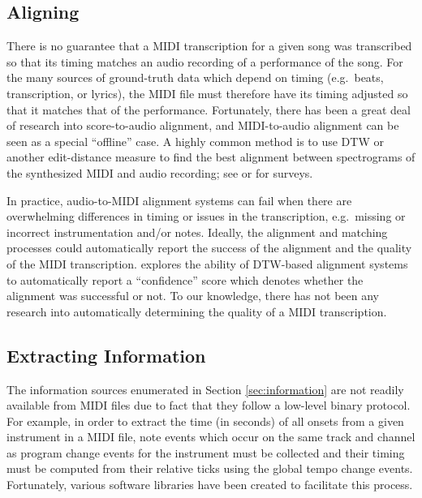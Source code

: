 \documentclass{article}
\begin{document}
\subsection{Aligning}

There is no guarantee that a MIDI transcription for a given song was transcribed so that its timing matches an audio recording of a performance of the song.
For the many sources of ground-truth data which depend on timing (e.g.\ beats, transcription, or lyrics), the MIDI file must therefore have its timing adjusted so that it matches that of the performance.
Fortunately, there has been a great deal of research into score-to-audio alignment, and MIDI-to-audio alignment can be seen as a special ``offline'' case.
A highly common method is to use DTW or another edit-distance measure to find the best alignment between spectrograms of the synthesized MIDI and audio recording; see \cite{raffel2016optimizing} or \cite{ewert2012towards} for surveys.

In practice, audio-to-MIDI alignment systems can fail when there are overwhelming differences in timing or issues in the transcription, e.g.\ missing or incorrect instrumentation and/or notes.
Ideally, the alignment and matching processes could automatically report the success of the alignment and the quality of the MIDI transcription.
\cite{raffel2016optimizing} explores the ability of DTW-based alignment systems to automatically report a ``confidence'' score which denotes whether the alignment was successful or not.
To our knowledge, there has not been any research into automatically determining the quality of a MIDI transcription.

\subsection{Extracting Information}

The information sources enumerated in Section \ref{sec:information} are not readily available from MIDI files due to fact that they follow a low-level binary protocol.
For example, in order to extract the time (in seconds) of all onsets from a given instrument in a MIDI file, note events which occur on the same track and channel as program change events for the instrument must be collected and their timing must be computed from their relative ticks using the global tempo change events.
Fortunately, various software libraries have been created to facilitate this process.
\end{document}
